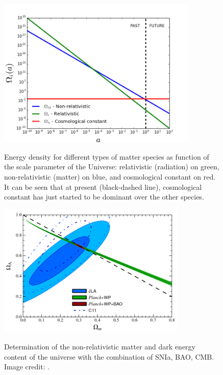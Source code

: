 \begin{figure}
\begin{center}
\includegraphics[width=0.85\textwidth]{./Pictures/rho_a.png}
\caption{Energy density for different types of matter species as function of the scale parameter of the Universe: relativistic (radiation) on green, non-relativistic (matter) on blue, and cosmological constant on red. It can be seen that at present (black-dashed line), cosmological constant has just started to be dominant over the other species.}
\label{fig:rho_de}
\vspace*{0.2cm}
\includegraphics[width=0.8\textwidth]{./Pictures/om_ol.png}
\caption{Determination of the non-relativistic matter and dark energy content of the universe with the combination of SNIa, BAO, CMB. Image credit: \cite{2014A&A...568A..22B}.}
\label{fig:om_ol}
\end{center}
\end{figure}
\newline

